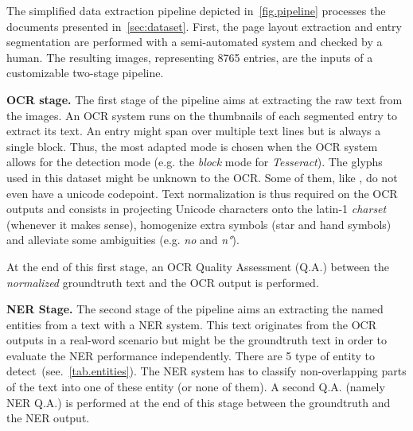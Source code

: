 
The simplified data extraction pipeline depicted in~\cref{fig.pipeline} processes the documents presented
in~\cref{sec:dataset}. First, the page layout extraction and entry segmentation are performed with a
semi-automated system and checked by a human. The resulting images, representing 8765 entries, are the inputs of a customizable two-stage pipeline.

\textbf{OCR stage.} The first stage of the pipeline aims at extracting the raw text from the images. An OCR system runs
on the thumbnails of each segmented entry to extract its text. An entry might span over multiple text lines but is
always a single block. Thus, the most adapted mode is chosen when the OCR system allows for the detection mode (e.g. the
\emph{block} mode for \emph{Tesseract}). The glyphs used in this dataset might be unknown to the OCR. Some of them, like
, do not even have a unicode codepoint. Text normalization is thus required
on the OCR outputs and consists in projecting Unicode characters onto the latin-1 \emph{charset} (whenever it makes
sense), homogenize extra symbols (star and hand symbols) and alleviate some ambiguities (e.g. \emph{no} and \emph{n°}).

At the end of this first stage, an OCR Quality Assessment (Q.A.) between the \emph{normalized} groundtruth text and the
OCR output is performed.





\textbf{NER Stage.} The second stage of the pipeline aims an extracting the named entities from a text with a NER
system. This text originates from the OCR outputs in a real-word scenario but might be the groundtruth text in order to
evaluate the NER performance independently. There are 5 type of entity to detect~(see.~\cref{tab.entities}).
The NER system has to classify non-overlapping parts of the text into one of these entity (or none of them). A second
Q.A. (namely NER Q.A.) is performed at the end of this stage between the groundtruth and the NER output.

